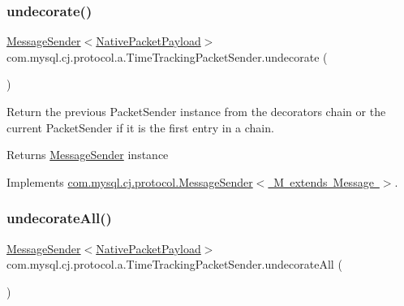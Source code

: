 \subsubsection{\texorpdfstring{undecorate()}{undecorate()}}
{\footnotesize\ttfamily \mbox{\hyperlink{interfacecom_1_1mysql_1_1cj_1_1protocol_1_1_message_sender}{Message\+Sender}}$<$\mbox{\hyperlink{classcom_1_1mysql_1_1cj_1_1protocol_1_1a_1_1_native_packet_payload}{Native\+Packet\+Payload}}$>$ com.\+mysql.\+cj.\+protocol.\+a.\+Time\+Tracking\+Packet\+Sender.\+undecorate (\begin{DoxyParamCaption}{ }\end{DoxyParamCaption})}

Return the previous Packet\+Sender instance from the decorators chain or the current Packet\+Sender if it is the first entry in a chain.

\begin{DoxyReturn}{Returns}
\mbox{\hyperlink{interfacecom_1_1mysql_1_1cj_1_1protocol_1_1_message_sender}{Message\+Sender}} instance 
\end{DoxyReturn}


Implements \mbox{\hyperlink{interfacecom_1_1mysql_1_1cj_1_1protocol_1_1_message_sender_a3a352bf35ad98dc6cea7c1f4ac9480da}{com.\+mysql.\+cj.\+protocol.\+Message\+Sender$<$ M extends Message $>$}}.

\mbox{\label{classcom_1_1mysql_1_1cj_1_1protocol_1_1a_1_1_time_tracking_packet_sender_a26a673b209acd1d181f62dceed280750}} 
\subsubsection{\texorpdfstring{undecorate\+All()}{undecorateAll()}}
{\footnotesize\ttfamily \mbox{\hyperlink{interfacecom_1_1mysql_1_1cj_1_1protocol_1_1_message_sender}{Message\+Sender}}$<$\mbox{\hyperlink{classcom_1_1mysql_1_1cj_1_1protocol_1_1a_1_1_native_packet_payload}{Native\+Packet\+Payload}}$>$ com.\+mysql.\+cj.\+protocol.\+a.\+Time\+Tracking\+Packet\+Sender.\+undecorate\+All (\begin{DoxyParamCaption}{ }\end{DoxyParamCaption})}

